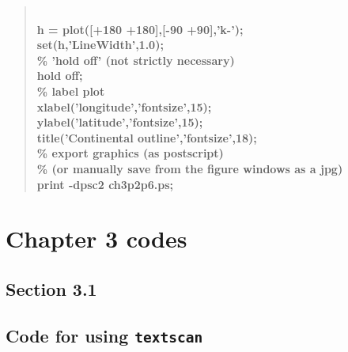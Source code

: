\documentclass{tufte-book} %
\newenvironment{docspecbold}{\begin{quotation}\ttfamily\bfseries\parskip0pt\parindent0pt\ignorespaces}{\end{quotation}}
\begin{document}
\begin{docspecbold}
\\h = plot([+180 +180],[-90 +90],'k-');
\\set(h,'LineWidth',1.0);
\\\textcolor[rgb]{0,0.501961,0}{\% 'hold off' (not strictly necessary)}
\\hold off;
\\\textcolor[rgb]{0,0.501961,0}{\% label plot}
\\xlabel('longitude','fontsize',15);
\\ylabel('latitude','fontsize',15);
\\title('Continental outline','fontsize',18);
\\\textcolor[rgb]{0,0.501961,0}{\% export graphics (as postscript)
\\\% (or manually save from the figure windows as a jpg)}
\\print -dpsc2 ch3p2p6.ps;
\end{docspecbold}


\newpage


\section{Chapter 3 codes}


\subsection*{\textbf{Section 3.1}}

\subsection*{Code for using \texttt{textscan}}
\end{document}
